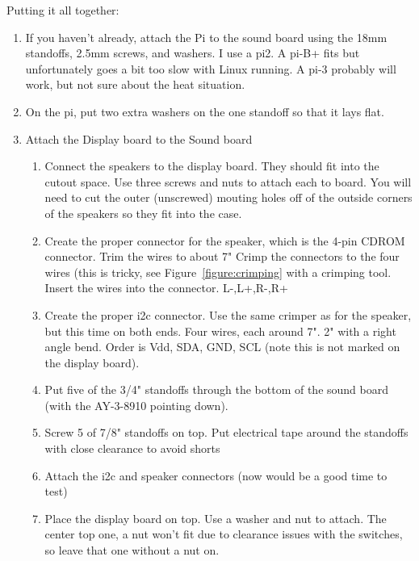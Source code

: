 \documentclass[11pt]{article}
\begin{document}
Putting it all together:
\begin{enumerate}

	\item If you haven't already, attach the Pi to the sound board using the 
		18mm standoffs, 2.5mm screws, and washers.
		I use a pi2.
		A pi-B+ fits but unfortunately goes a bit too slow with Linux running.
		A pi-3 probably will work, but not sure about the heat situation.

	\item	On the pi, put two extra washers on the one standoff so that it lays
			flat.

	\item Attach the Display board to the Sound board

		\begin{enumerate}
		
		\item Connect the speakers to the display board.
			They should fit into the cutout space.
			Use three screws and nuts to attach each to board.
			You will need to cut the outer (unscrewed) mouting holes
			off of the outside corners of the speakers so they fit into
			the case.

		\item Create the proper connector for the speaker, which is the 4-pin CDROM
			connector.  Trim the wires to about 7"
			Crimp the connectors to the four wires (this is tricky, see
			Figure~\ref{figure:crimping} with a crimping tool.
			Insert the wires into the connector. L-,L+,R-,R+

		\item Create the proper i2c connector.
			Use the same crimper as for the speaker, but this time on both
			ends.  Four wires, each around 7".  2" with a right angle bend.
			Order is Vdd, SDA, GND, SCL (note this is not marked on
			the display board).

		\item Put five of the 3/4" standoffs through the bottom of the sound board
			(with the AY-3-8910 pointing down).

		\item Screw 5 of 7/8" standoffs on top.
			Put electrical tape around the standoffs with close clearance
			to avoid shorts

		\item Attach the i2c and speaker connectors (now would be a good time to test)

		\item Place the display board on top.
			Use a washer and nut to attach.
			The center top one, a nut won't fit due to clearance issues with
			the switches, so leave that one without a nut on.


\end{enumerate}
\end{enumerate}
\end{document}
